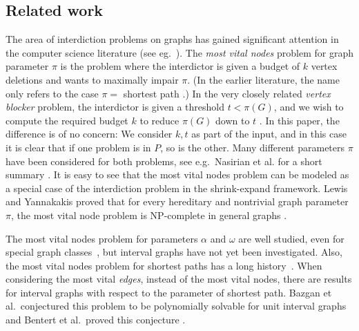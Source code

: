 \subsection{Related work}
The area of interdiction problems on graphs has gained significant attention in 
the computer science literature (see eg.~\cite{NetworkInterdictProblemsBookChapter}).
The \emph{most vital nodes} problem for graph parameter $\pi$ is the problem where the interdictor is given a budget of $k$ vertex deletions and wants to maximally impair $\pi$. (In the earlier literature, the name only refers to the case $\pi =$  shortest path \cite{mostVitalLinksNodes1982}.)  In the very closely related \emph{vertex blocker} problem, the interdictor is given a threshold $t < \pi(G)$, and we wish to compute the required budget $k$ to reduce $\pi(G)$ down to $t$ \cite{shortPathsInterdictionTotalAndNodeWise}. In this paper, the difference is of no concern: We consider $k, t$ as part of the input, and in this case it is clear that if one problem is in $P$, so is the other. Many different parameters $\pi$ have been considered for both problems, see e.g.\ Nasirian et al. for a short summary \cite{nasirian2019exact}.
It is easy to see that the most vital nodes problem can be modeled as a special case of the interdiction problem in the shrink-expand framework.
Lewis and Yannakakis proved that for every hereditary and nontrivial graph parameter $\pi$, 
the most vital node problem is NP-complete in general graphs \cite{metaTheoremHereditary}.
 
The most vital nodes problem for parameters $\alpha$ and $\omega$ are well studied, 
even for special graph classes~\cite{mostVitalNodesWrtIndSet,costa2011minimum},
but interval graphs have not yet been investigated. Also, the most vital nodes 
problem for shortest paths has a long history~\cite{baier2010length,complexityOfFindingMostVitalNodesShortestPath,mostVitalLinksNodes1982,shortPathsInterdictionTotalAndNodeWise}.
When considering the most vital \emph{edges}, instead of the most vital nodes, there are results for interval graphs with respect to the parameter of shortest path. Bazgan et al.\ conjectured this problem to be polynomially solvable for unit interval graphs \cite{bazgan2019more} and Bentert et al.\ proved this conjecture \cite{bentert2019lengthboundedcuts}.



